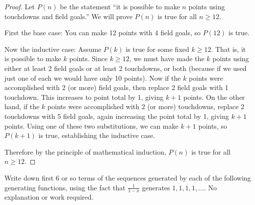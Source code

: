 \documentclass[11pt]{exam}
\def\d{\displaystyle}
\begin{document}
\begin{questions}
\begin{solution}
  \begin{proof}
    Let $P(n)$ be the statement ``it is possible to make $n$ points using touchdowns and field goals.''  We will prove $P(n)$ is true for all $n \ge 12$.
    
    First the base case: You can make 12 points with 4 field goals, so $P(12)$ is true.
    
    Now the inductive case: Assume $P(k)$ is true for some fixed $k \ge 12$.  That is, it is possible to make $k$ points.  Since $k \ge 12$, we must have made the $k$ points using either at least 2 field goals or at least 2 touchdowns, or both (because if we used just one of each we would have only 10 points).  Now if the $k$ points were accomplished with 2 (or more) field goals, then replace 2 field goals with 1 touchdown.  This increases to point total by 1, giving $k + 1$ points.  On the other hand, if the $k$ points were accomplished with $2$ (or more) touchdowns, replace 2 touchdowns with 5 field goals, again increasing the point total by 1, giving $k+1$ points.  Using one of these two substitutions, we can make $k+1$ points, so $P(k+1)$ is true, establishing the inductive case.
    
    Therefore by the principle of mathematical induction, $P(n)$ is true for all $n \ge 12$.
  \end{proof}

\end{solution}


\question[4] Write down first 6 or so terms of the sequences generated by each of the following generating functions, using the fact that $\frac{1}{1-x}$ generates $1,1,1,1,\ldots$.  No explanation or work required.
\end{questions}
\end{document}
